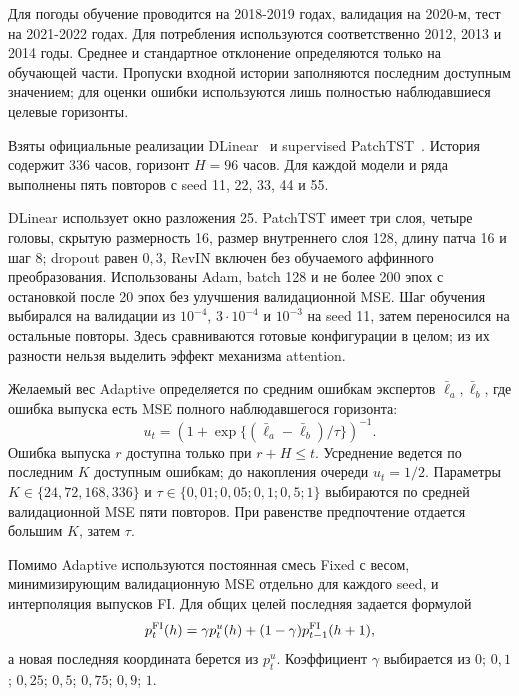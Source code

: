 \documentclass{misisarticle}
\begin{document}
Для погоды обучение проводится на 2018-2019 годах, валидация на 2020-м, тест на 2021-2022 годах. Для потребления используются соответственно 2012, 2013 и 2014 годы. Среднее и стандартное отклонение определяются только на обучающей части. Пропуски входной истории заполняются последним доступным значением; для оценки ошибки используются лишь полностью наблюдавшиеся целевые горизонты.

Взяты официальные реализации DLinear~\cite{dlinearcode} и supervised PatchTST~\cite{nie2023}. История содержит 336 часов, горизонт $H=96$ часов. Для каждой модели и ряда выполнены пять повторов с seed 11, 22, 33, 44 и 55.

DLinear использует окно разложения 25. PatchTST имеет три слоя, четыре головы, скрытую размерность 16, размер внутреннего слоя 128, длину патча 16 и шаг 8; dropout равен $0{,}3$, RevIN включен без обучаемого аффинного преобразования. Использованы Adam, batch 128 и не более 200 эпох с остановкой после 20 эпох без улучшения валидационной MSE. Шаг обучения выбирался на валидации из $10^{-4}$, $3\cdot10^{-4}$ и $10^{-3}$ на seed 11, затем переносился на остальные повторы. Здесь сравниваются готовые конфигурации в целом; из их разности нельзя выделить эффект механизма attention.

Желаемый вес Adaptive определяется по средним ошибкам экспертов $\bar\ell_a,\bar\ell_b$, где ошибка выпуска есть MSE полного наблюдавшегося горизонта:
\begin{equation}
 u_t=\left(1+\exp\{(\bar\ell_a-\bar\ell_b)/\tau\}\right)^{-1}.
 \label{eq:adaptive}
\end{equation}
Ошибка выпуска $r$ доступна только при $r+H\leq t$. Усреднение ведется по последним $K$ доступным ошибкам; до накопления очереди $u_t=1/2$. Параметры $K\in\{24,72,168,336\}$ и $\tau\in\{0{,}01;0{,}05;0{,}1;0{,}5;1\}$ выбираются по средней валидационной MSE пяти повторов. При равенстве предпочтение отдается большим $K$, затем $\tau$.

Помимо Adaptive используются постоянная смесь Fixed с весом, минимизирующим валидационную MSE отдельно для каждого seed, и интерполяция выпусков FI. Для общих целей последняя задается формулой
\begin{equation}
 p_t^{\rm FI}(h)=
 \gamma p_t^{u}(h)+(1-\gamma)p_{t-1}^{\rm FI}(h+1),
 \label{eq:fi}
\end{equation}
а новая последняя координата берется из $p_t^u$. Коэффициент $\gamma$ выбирается из $0$; $0{,}1$; $0{,}25$; $0{,}5$; $0{,}75$; $0{,}9$; $1$.
\end{document}
